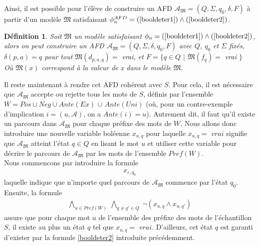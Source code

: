 \documentclass[12pt,a4paper,oneside,titlepage]{report}
\newtheorem{defi}{D\'efinition}[section]
\begin{document}
\noindent Ainsi, il est possible pour l'élève de construire un AFD $\mathcal{A}_\mathfrak{M}=(Q,\Sigma,q_0,\delta,F)$ à partir d'un modèle $\mathfrak{M}$ satisfaisant $\phi_n^{AFD}=(\ref{booldeter1})\land(\ref{booldeter2})$.
\begin{defi}
Soit $\mathfrak{M}$ un modèle satisfaisant $\phi_n=(\ref{booldeter1})\land(\ref{booldeter2})$, alors on peut construire un AFD $\mathcal{A}_\mathfrak{M}=(Q,\Sigma,\delta,q_0,F)$ avec $Q$, $q_0$ et $\Sigma$ fixés, $\delta(p,a)=q$ pour tout $\mathfrak{M}(d_{p,a,q})=$ vrai, et $F=\{q\in Q$ $|$ $\mathfrak{M}(f_q)=$ vrai $\}$\\
Où $\mathfrak{M}(x)$ correspond à la valeur de x dans le modèle $\mathfrak{M}$.
\end{defi}
Il reste maintenant à rendre cet AFD cohérent avec $S$. Pour cela, il est nécessaire que $\mathcal{A}_\mathfrak{M}$ accepte ou rejette tous les mots de $S$, définis par l'ensemble $W=Pos\cup Neg\cup Ante(Ex)$ $\cup$ $Ante(Uni)$ (où, pour un contre-exemple d'implication $i=(u,\mathcal{A})$, on a $Ante(i)=u$). Autrement dit, il faut qu'il existe un parcours dans $\mathcal{A}_\mathfrak{M}$ pour chaque préfixe des mots de $W$. Nous allons donc introduire une nouvelle variable boléenne $x_{u,q}$ pour laquelle $x_{u,q}=$ $vrai$ signifie que $\mathcal{A}_\mathfrak{M}$ atteint l'état $q\in Q$ en lisant le mot $u$ et utiliser cette variable pour décrire le parcours de $\mathcal{A}_\mathfrak{M}$ par les mots de l'ensemble $Pref(W)$.\\

\noindent Nous commencons par introduire la formule
\begin{equation}
\label{boolW1}
\begin{aligned} x_{\varepsilon , q_0} \end{aligned}
\end{equation}
laquelle indique que n'importe quel parcours de $\mathcal{A}_\mathfrak{M}$ commence par l'état $q_0$.\\ 
Ensuite, la formule
\begin{equation}
\label{boolW2}
\begin{aligned} \bigwedge _{u \in Pref (W)}~ \bigwedge _{q \ne q' \in Q}~ \neg (x_{u, q} \land x_{u,q'}) \end{aligned}
\end{equation}
assure que pour chaque mot $u$ de l'ensemble des préfixe des mots de l'échantillon $S$, il existe au plus un état $q$ tel que $x_{u,q}=$ $vrai$. D'ailleurs, cet état $q$ est garanti d'exister par la formule \ref{booldeter2} introduite précédemment.
\end{document}
